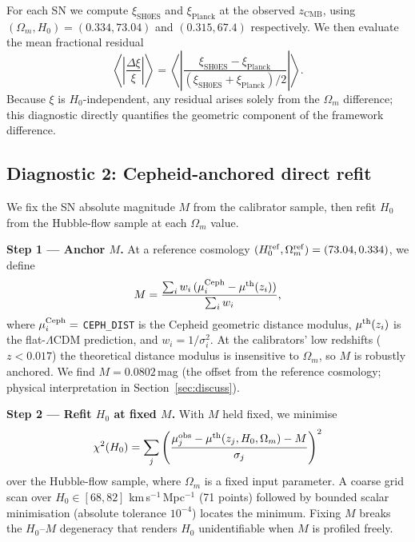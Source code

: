 \documentclass[usenatbib]{mnras}
\begin{document}
For each SN we compute $\xi_\mathrm{SH0ES}$ and $\xi_\mathrm{Planck}$
at the observed $z_\mathrm{CMB}$, using
$(\Omega_m, H_0) = (0.334, 73.04)$ and $(0.315, 67.4)$ respectively.
We then evaluate the mean fractional residual
\begin{equation}
  \left\langle\left|\frac{\Delta\xi}{\xi}\right|\right\rangle
  = \left\langle\left|
      \frac{\xi_\mathrm{SH0ES} - \xi_\mathrm{Planck}}
           {(\xi_\mathrm{SH0ES}+\xi_\mathrm{Planck})/2}
    \right|\right\rangle.
  \label{eq:xi_residual}
\end{equation}
Because $\xi$ is $H_0$-independent, any residual arises solely from
the $\Omega_m$ difference; this diagnostic directly quantifies the
geometric component of the framework difference.

\subsection{Diagnostic 2: Cepheid-anchored direct refit}
\label{sec:refit}

We fix the SN absolute magnitude $M$ from the calibrator sample, then
refit $H_0$ from the Hubble-flow sample at each $\Omega_m$ value.

\textbf{Step 1 — Anchor $M$.}
At a reference cosmology $(H_0^{\rm ref}, \Omega_m^{\rm ref}) = (73.04, 0.334)$,
we define
\begin{equation}
  M = \frac{\sum_i w_i\,(\mu_i^{\rm Ceph} - \mu^{\rm th}(z_i))}
           {\sum_i w_i},
\end{equation}
where $\mu_i^{\rm Ceph} =$ \texttt{CEPH\_DIST} is the Cepheid geometric
distance modulus, $\mu^{\rm th}(z_i)$ is the flat-$\Lambda$CDM prediction,
and $w_i = 1/\sigma_i^2$.
At the calibrators' low redshifts ($z < 0.017$) the theoretical distance
modulus is insensitive to $\Omega_m$, so $M$ is robustly anchored.
We find $M = 0.0802$\,mag (the offset from the reference cosmology;
physical interpretation in Section~\ref{sec:discuss}).

\textbf{Step 2 — Refit $H_0$ at fixed $M$.}
With $M$ held fixed, we minimise
\begin{equation}
  \chi^2(H_0) = \sum_j
    \left(\frac{\mu_j^{\rm obs} - \mu^{\rm th}(z_j, H_0, \Omega_m) - M}
               {\sigma_j}\right)^2
  \label{eq:chi2}
\end{equation}
over the Hubble-flow sample, where $\Omega_m$ is a fixed input parameter.
A coarse grid scan over $H_0 \in [68, 82]$ km\,s$^{-1}$\,Mpc$^{-1}$
(71 points) followed by bounded scalar minimisation
(absolute tolerance $10^{-4}$) locates the minimum.
Fixing $M$ breaks the $H_0$--$M$ degeneracy that renders $H_0$
unidentifiable when $M$ is profiled freely.
\end{document}

